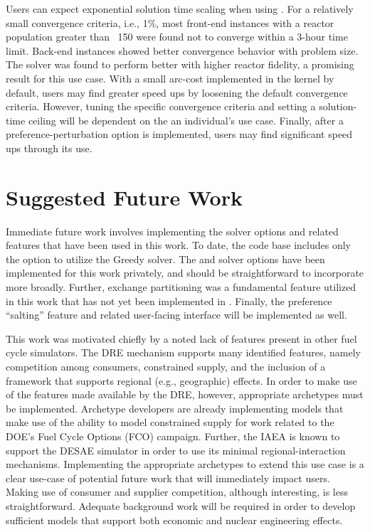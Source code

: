 Users can expect exponential solution time scaling when using \cbc. For a
relatively small convergence criteria, i.e., 1\%, most front-end instances with
a reactor population greater than ~150 were found not to converge within a
3-hour time limit. Back-end instances showed better convergence behavior with
problem size. The \cbc solver was found to perform better with higher reactor
fidelity, a promising result for this use case. With a small arc-cost
implemented in the kernel by default, users may find greater speed ups by
loosening the default convergence criteria. However, tuning the specific
convergence criteria and setting a solution-time ceiling will be dependent on
the an individual's use case. Finally, after a preference-perturbation option is
implemented, users may find significant speed ups through its use.

\section{Suggested Future Work}

Immediate future work involves implementing the solver options and related
features that have been used in this work. To date, the \Cyclus code base
includes only the option to utilize the Greedy solver. The \cbc and \clp solver
options have been implemented for this work privately, and should be
straightforward to incorporate more broadly. Further, exchange partitioning was
a fundamental feature utilized in this work that has not yet been implemented in
\Cyclus. Finally, the preference ``salting'' feature and related user-facing
interface will be implemented as well.

This work was motivated chiefly by a noted lack of features present in other
fuel cycle simulators. The DRE mechanism supports many identified features,
namely competition among consumers, constrained supply, and the inclusion of a
framework that supports regional (e.g., geographic) effects. In order to make
use of the features made available by the DRE, however, appropriate \Cyclus
archetypes must be implemented. Archetype developers are already implementing
models that make use of the ability to model constrained supply for work related
to the DOE's Fuel Cycle Options (FCO) campaign. Further, the IAEA is known to
support the DESAE simulator \cite{andrianova_desae_2008} in order to use its
minimal regional-interaction mechanisms. Implementing the appropriate archetypes
to extend this use case is a clear use-case of potential future work that will
immediately impact users. Making use of consumer and supplier competition,
although interesting, is less straightforward. Adequate background work will be
required in order to develop sufficient models that support both economic and
nuclear engineering effects.

